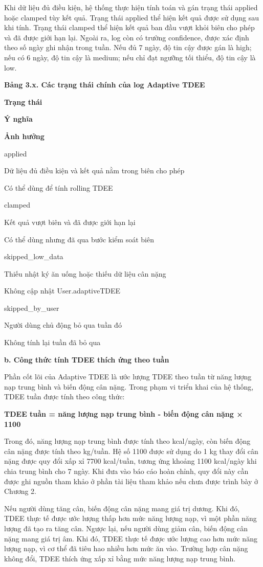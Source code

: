 Khi dữ liệu đủ điều kiện, hệ thống thực hiện tính toán và gán trạng thái applied hoặc clamped tùy kết quả. Trạng thái applied thể hiện kết quả được sử dụng sau khi tính. Trạng thái clamped thể hiện kết quả ban đầu vượt khỏi biên cho phép và đã được giới hạn lại. Ngoài ra, log còn có trường confidence, được xác định theo số ngày ghi nhận trong tuần. Nếu đủ 7 ngày, độ tin cậy được gán là high; nếu có 6 ngày, độ tin cậy là medium; nếu chỉ đạt ngưỡng tối thiểu, độ tin cậy là low.

\textbf{Bảng 3.x. Các trạng thái chính của log Adaptive TDEE}

\textbf{Trạng thái}

\textbf{Ý nghĩa}

\textbf{Ảnh hưởng}

applied

Dữ liệu đủ điều kiện và kết quả nằm trong biên cho phép

Có thể dùng để tính rolling TDEE

clamped

Kết quả vượt biên và đã được giới hạn lại

Có thể dùng nhưng đã qua bước kiểm soát biên

skipped\_low\_data

Thiếu nhật ký ăn uống hoặc thiếu dữ liệu cân nặng

Không cập nhật User.adaptiveTDEE

skipped\_by\_user

Người dùng chủ động bỏ qua tuần đó

Không tính lại tuần đã bỏ qua

\textbf{b. Công thức tính TDEE thích ứng theo tuần}

Phần cốt lõi của Adaptive TDEE là ước lượng TDEE theo tuần từ năng lượng nạp trung bình và biến động cân nặng. Trong phạm vi triển khai của hệ thống, TDEE tuần được tính theo công thức:

\textbf{TDEE tuần = năng lượng nạp trung bình - biến động cân nặng × 1100}

Trong đó, năng lượng nạp trung bình được tính theo kcal/ngày, còn biến động cân nặng được tính theo kg/tuần. Hệ số 1100 được sử dụng do 1 kg thay đổi cân nặng được quy đổi xấp xỉ 7700 kcal/tuần, tương ứng khoảng 1100 kcal/ngày khi chia trung bình cho 7 ngày. Khi đưa vào báo cáo hoàn chỉnh, quy đổi này cần được ghi nguồn tham khảo ở phần tài liệu tham khảo nếu chưa được trình bày ở Chương 2.

Nếu người dùng tăng cân, biến động cân nặng mang giá trị dương. Khi đó, TDEE thực tế được ước lượng thấp hơn mức năng lượng nạp, vì một phần năng lượng đã tạo ra tăng cân. Ngược lại, nếu người dùng giảm cân, biến động cân nặng mang giá trị âm. Khi đó, TDEE thực tế được ước lượng cao hơn mức năng lượng nạp, vì cơ thể đã tiêu hao nhiều hơn mức ăn vào. Trường hợp cân nặng không đổi, TDEE thích ứng xấp xỉ bằng mức năng lượng nạp trung bình.


